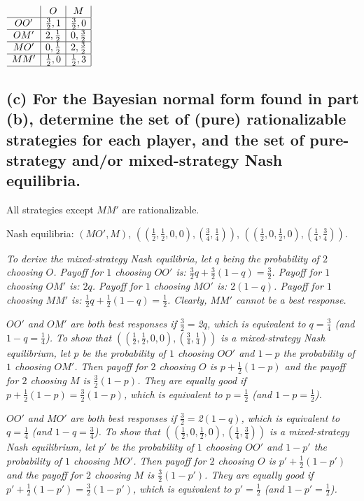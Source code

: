 \documentclass{article}
\begin{document}
\begin{center}
$
\begin{array}{c|c|c|}
 & O & M \\
\hline
OO' & \tfrac32,1 & \tfrac32,0 \\
\hline
OM' & 2,\tfrac12 & 0,\tfrac32 \\
\hline
MO' & 0,\tfrac12 & 2,\tfrac32 \\
\hline
MM' & \tfrac12,0 & \tfrac12,3 \\
\hline
\end{array}
$
\end{center}
%
\subsection*{(c) For the Bayesian normal form found in part (b), determine the set of
(pure) rationalizable strategies for each player, and the set of pure-strategy and/or
mixed-strategy Nash equilibria. }

All strategies except $MM'$ are rationalizable.

Nash equilibria: $(MO', M)$, $\left( \left( \tfrac12, \tfrac12, 0, 0 \right), \left( \tfrac34, \tfrac14 \right) \right)$,  $\left( \left( \tfrac12, 0, \tfrac12, 0 \right), \left( \tfrac14, \tfrac34 \right) \right)$. 

\textit{To derive the mixed-strategy Nash equilibria, let $q$ being the probability of $2$ choosing $O$. Payoff for $1$ choosing $OO'$ is: $\tfrac32 q + \tfrac32 (1-q) = \tfrac32$. Payoff for $1$ choosing $OM'$ is: $2 q$. Payoff for $1$ choosing $MO'$ is: $2 (1-q)$. Payoff for $1$ choosing $MM'$ is: $\tfrac12 q + \tfrac12 (1-q) = \tfrac12$. Clearly, $MM'$ cannot be a best response.}

\textit{$OO'$ and $OM'$ are both best responses if $\tfrac32 = $2$ q$, which is equivalent to $q = \tfrac34$  (and $1-q=\tfrac14$). To show that $\left( \left( \tfrac12, \tfrac12, 0, 0 \right), \left( \tfrac34, \tfrac14 \right) \right)$ is a mixed-strategy Nash equilibrium, let $p$ be the probability of $1$ choosing $OO'$ and $1-p$ the probability of $1$ choosing $OM'$. Then payoff for $2$ choosing $O$ is $p + \tfrac12 (1-p)$ and the payoff for $2$ choosing $M$ is $\tfrac32 (1-p)$. They are equally good if $p + \tfrac12 (1-p) = \tfrac32 (1-p)$, which is equivalent to $p = \tfrac12$ (and $1-p = \tfrac12$).}

\textit{$OO'$ and $MO'$ are both best responses if $\tfrac32 = $2$ (1-q)$, which is equivalent to $q = \tfrac14$ (and $1-q=\tfrac34$). To show that $\left( \left( \tfrac12, 0, \tfrac12, 0 \right), \left( \tfrac14, \tfrac34 \right) \right)$ is a mixed-strategy Nash equilibrium, let $p'$ be the probability of $1$ choosing $OO'$ and $1-p'$ the probability of $1$ choosing $MO'$. Then payoff for $2$ choosing $O$ is $p' + \tfrac12 (1-p')$ and the payoff for $2$ choosing $M$ is $\tfrac32 (1-p')$. They are equally good if $p' + \tfrac12 (1-p') = \tfrac32 (1-p')$, which is equivalent to $p' = \tfrac12$ (and $1-p' = \tfrac12$).}
%
\end{document}
